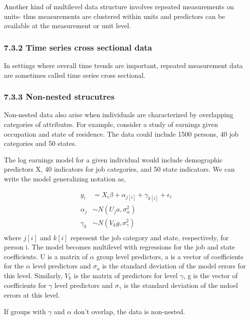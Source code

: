 \documentclass[12pt,]{article}
\begin{document}
Another kind of multilevel data structure involves repeated measurements
on units- thus measurements are clustered within units and predictors
can be available at the measurement or unit level.

\subsubsection{7.3.2 Time series cross sectional
data}\label{time-series-cross-sectional-data}

In settings where overall time trends are important, repeated
measurement data are sometimes called time series cross sectional.

\subsubsection{7.3.3 Non-nested strucutres}\label{non-nested-strucutres}

Non-nested data also arise when individuals are characterized by
overlapping categories of attributes. For example, consider a study of
earnings given occupation and state of residence. The data could include
1500 persons, 40 job categories and 50 states.

The log earnings model for a given individual would include demographic
predictors X, 40 indicators for job categories, and 50 state indicators.
We can write the model generalizing notation as,

\[
\begin{aligned}
y_i &= X_i \beta + \alpha_{j[i]} + \gamma_{k[i]} +\epsilon_i\\
\alpha_j &\sim N(U_j a, \sigma^2_\alpha)\\
\gamma_k &\sim N(V_kg, \sigma^2_\gamma)\\
\end{aligned}
\] where \(j[i]\) and \(k[i]\) represent the job category and state,
respectively, for person i. The model becomes multilevel with
regressions for the job and state coefficients. U is a matrix of
\(\alpha\) group level predictors, a is a vector of coefficients for the
\(\alpha\) level predictors and \(\sigma_a\) is the standard deviation
of the model errors for this level. Similarly, \(V_k\) is the matrix of
predictors for level \(\gamma\), g is the vector of coefficients for
\(\gamma\) level predictors and \(\sigma_\gamma\) is the standard
deviation of the mdoel errors at this level.

If groups with \(\gamma\) and \(\alpha\) don't overlap, the data is
non-nested.
\end{document}
